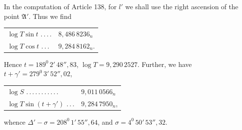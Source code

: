 In the computation of Article 138, for $l'$ we shall use the right ascension of the point $\mathfrak A'$. Thus we find
\begin{center}\begin{tabular}{ll}
$\log T\sin t$ .\,.\,.\,. & $8{,}486\,8236_n$\\
$\log T\cos t$ .\,.\,. & $9{,}284\,8162_n$.
\end{tabular}\end{center}
\noindent Hence $t=189^0\,2'\,48''{,}83$, $\log T=9{,}290\,2527$. Further, we have $t+\gamma'=279^0\,3'\,52''{,}02$,
\begin{center}\begin{tabular}{ll}
$\log S$ .\,.\,.\,.\,.\,.\,.\,.\,.\,.\,. & $9{,}011\,0566_n$\\
$\log T\sin(t+\gamma')$ .\,.\,. & $9{,}284\,7950_n$,
\end{tabular}\end{center}
\noindent whence $\Delta'-\sigma=208^0\,1'\,55''{,}64$, and $\sigma=4^0\,50'\,53''{,}32$.

